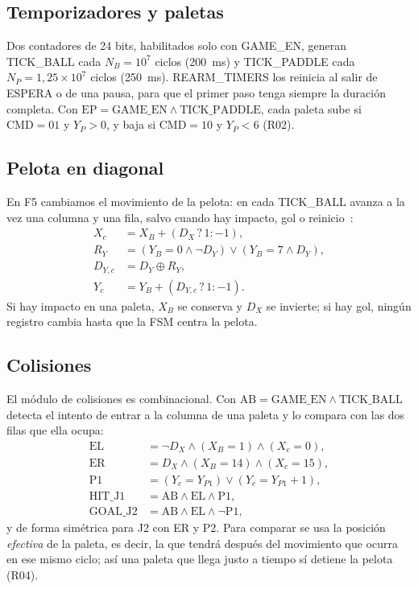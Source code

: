 \documentclass[conference,a4paper]{IEEEtran}
\begin{document}
\subsection{Temporizadores y paletas}

Dos contadores de 24 bits, habilitados solo con GAME\_EN, generan TICK\_BALL cada $N_{B}=10^7$ ciclos (200~ms) y TICK\_PADDLE cada $N_{P}=1{,}25\times10^7$ ciclos (250~ms). REARM\_TIMERS los reinicia al salir de ESPERA o de una pausa, para que el primer paso tenga siempre la duración completa. Con $\mathrm{EP}=\mathrm{GAME\_EN}\land\mathrm{TICK\_PADDLE}$, cada paleta sube si $\mathrm{CMD}=01$ y $Y_P>0$, y baja si $\mathrm{CMD}=10$ y $Y_P<6$ (R02).

\subsection{Pelota en diagonal}

En F5 cambiamos el movimiento de la pelota: en cada TICK\_BALL avanza a la vez una columna y una fila, salvo cuando hay impacto, gol o reinicio~\cite{f5}:
\begin{align}
X_{c} &= X_B + (D_X\,?\,1:-1),\\
R_Y &= (Y_B=0\land\lnot D_Y)\lor(Y_B=7\land D_Y),\\
D_{Y,c} &= D_Y\oplus R_Y,\\
Y_{c} &= Y_B + (D_{Y,c}\,?\,1:-1).
\end{align}
Si hay impacto en una paleta, $X_B$ se conserva y $D_X$ se invierte; si hay gol, ningún registro cambia hasta que la FSM centra la pelota.

\subsection{Colisiones}

El módulo de colisiones es combinacional. Con $\mathrm{AB}=\mathrm{GAME\_EN}\land\mathrm{TICK\_BALL}$ detecta el intento de entrar a la columna de una paleta y lo compara con las dos filas que ella ocupa:
\begin{align}
\mathrm{EL} &= \lnot D_X\land(X_B=1)\land(X_c=0),\\
\mathrm{ER} &= D_X\land(X_B=14)\land(X_c=15),\\
\mathrm{P1} &= (Y_c=Y_{P1})\lor(Y_c=Y_{P1}+1),\\
\mathrm{HIT\_J1} &= \mathrm{AB}\land\mathrm{EL}\land\mathrm{P1},\\
\mathrm{GOAL\_J2} &= \mathrm{AB}\land\mathrm{EL}\land\lnot\mathrm{P1},
\end{align}
y de forma simétrica para J2 con ER y P2. Para comparar se usa la posición \emph{efectiva} de la paleta, es decir, la que tendrá después del movimiento que ocurra en ese mismo ciclo; así una paleta que llega justo a tiempo sí detiene la pelota (R04).
\end{document}
